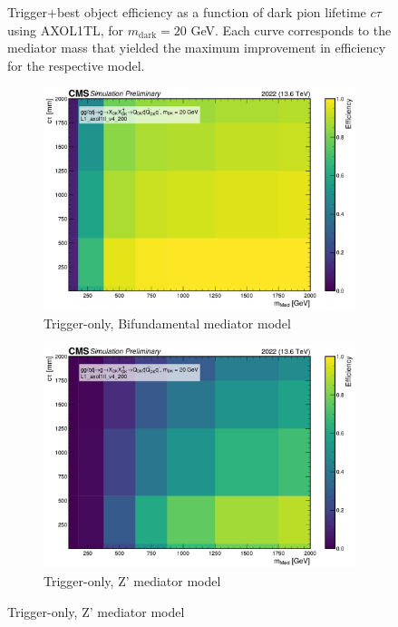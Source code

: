 \begin{figure}[h]
  \caption{Trigger+best object efficiency as a function of dark pion lifetime $c\tau$ using AXOL1TL, for $m_\mathrm{dark} = 20$ GeV. Each curve corresponds to the mediator mass that yielded the maximum improvement in efficiency for the respective model.}
  \label{fig:axol1tl_eff1D}
\end{figure}

\begin{figure}[h]
  \centering

  \begin{subfigure}[t]{0.45\textwidth}
    \centering
    \includegraphics[width=\linewidth]{images/L1/ad_2D_tchan/trigeffplots2D_L1_efftype-trig_t-channel_mDark-20_L1_axol1tl_v4_200_study_cloppear.pdf}
    \caption{Trigger-only, Bifundamental mediator model}
    \label{fig:axol1tl_trig_tchan}
  \end{subfigure}
  \hfill
  \begin{subfigure}[t]{0.45\textwidth}
    \centering
    \includegraphics[width=\linewidth]{images/L1/ad_2D_schan/trigeffplots2D_L1_efftype-trig_s-channel_mDark-20_L1_axol1tl_v4_200_study_cloppear.pdf}
    \caption{Trigger-only, Z' mediator model}
    \label{fig:axol1tl_trig_schan}
  \end{subfigure}


\end{figure}
